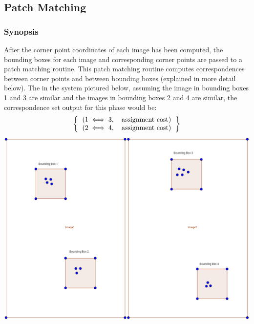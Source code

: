 \documentclass{article}
\begin{document}
\newpage
\subsection{Patch Matching}
\subsubsection{Synopsis}
After the corner point coordinates of each image has been computed, the bounding boxes for each image and corresponding corner points are passed to a patch matching routine.  This patch matching routine computes correspondences between corner points and between bounding boxes (explained in more detail below).  The in the system pictured below, assuming the image in bounding boxes 1 and 3 are similar and the images in bounding boxes 2 and 4 are similar, the correspondence set output for this phase would be:
\[
\left \{
\begin{tabular}{c}
$(1 \iff 3,\quad \text{assignment cost})$ \\
$(2 \iff 4,\quad \text{assignment cost})$
\end{tabular}
\right \}
\]
\includegraphics[width=\textwidth]{after_corner}
\end{document}
